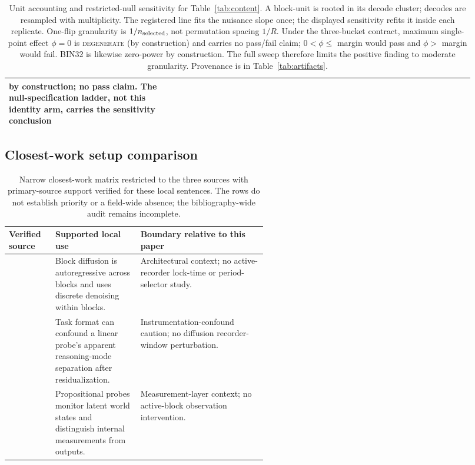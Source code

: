 \documentclass{article}
\begin{document}
\begin{table}[H]
\begin{tabular}{@{}>{\raggedright\arraybackslash}p{0.34\linewidth}
                    >{\raggedright\arraybackslash}p{0.25\linewidth}
                    >{\raggedright\arraybackslash}p{0.33\linewidth}@{}}
by construction; no pass claim. The null-specification ladder, not this identity
arm, carries the sensitivity conclusion \\
\bottomrule
\end{tabular}
\caption{Unit accounting and restricted-null sensitivity for
Table~\ref{tab:content}. A block-unit is rooted in its decode cluster; decodes are
resampled with multiplicity. The registered line fits the nuisance slope once;
the displayed sensitivity refits it inside each replicate. One-flip granularity
is $1/n_{\rm selected}$, not permutation spacing $1/R$. Under the three-bucket
contract, maximum single-point effect $\phi=0$ is \textsc{degenerate}
(by construction) and carries no pass/fail claim; $0<\phi\le$ margin would pass
and $\phi>$ margin would fail. BIN32 is likewise zero-power by construction.
The full sweep therefore limits the positive finding to moderate granularity.
Provenance is in Table~\ref{tab:artifacts}.}
\label{tab:content-audit}
\end{table}

\subsection{Closest-work setup comparison}

\begin{table}[H]
\centering
\footnotesize
\setlength{\tabcolsep}{3pt}
\begin{tabularx}{\linewidth}{@{}>{\raggedright\arraybackslash}p{0.18\linewidth}
  >{\raggedright\arraybackslash}p{0.33\linewidth}
  >{\raggedright\arraybackslash}X@{}}
\toprule
Verified source & Supported local use & Boundary relative to this paper \\
\midrule
\citet{arriola2025block} & Block diffusion is autoregressive across blocks and uses discrete denoising within blocks. & Architectural context; no active-recorder lock-time or period-selector study. \\
\citet{sahoo2026linearprobes} & Task format can confound a linear probe's apparent reasoning-mode separation after residualization. & Instrumentation-confound caution; no diffusion recorder-window perturbation. \\
\citet{feng2024monitoring} & Propositional probes monitor latent world states and distinguish internal measurements from outputs. & Measurement-layer context; no active-block observation intervention. \\
\bottomrule
\end{tabularx}
\caption{Narrow closest-work matrix restricted to the three sources with
primary-source support verified for these local sentences. The rows do not
establish priority or a field-wide absence; the bibliography-wide audit remains
incomplete.}
\label{tab:closest}
\end{table}
\end{document}
